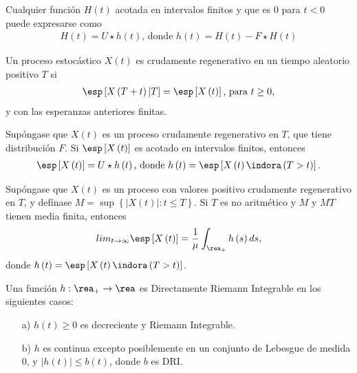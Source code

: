 \begin{Prop}
Cualquier funci\'on $H\left(t\right)$ acotada en intervalos finitos y que es 0 para $t<0$ puede expresarse como
\begin{eqnarray*}
H\left(t\right)=U\star h\left(t\right)\textrm{,  donde }h\left(t\right)=H\left(t\right)-F\star H\left(t\right)
\end{eqnarray*}
\end{Prop}

\begin{Def}
Un proceso estoc\'astico $X\left(t\right)$ es crudamente regenerativo en un tiempo aleatorio positivo $T$ si
\begin{eqnarray*}
\esp\left[X\left(T+t\right)|T\right]=\esp\left[X\left(t\right)\right]\textrm{, para }t\geq0,\end{eqnarray*}
y con las esperanzas anteriores finitas.
\end{Def}

\begin{Prop}
Sup\'ongase que $X\left(t\right)$ es un proceso crudamente regenerativo en $T$, que tiene distribuci\'on $F$. Si $\esp\left[X\left(t\right)\right]$ es acotado en intervalos finitos, entonces
\begin{eqnarray*}
\esp\left[X\left(t\right)\right]=U\star h\left(t\right)\textrm{,  donde }h\left(t\right)=\esp\left[X\left(t\right)\indora\left(T>t\right)\right].
\end{eqnarray*}
\end{Prop}

\begin{Teo}
Sup\'ongase que $X\left(t\right)$ es un proceso con valores positivo crudamente regenerativo en $T$, y def\'inase $M=\sup\left\{|X\left(t\right)|:t\leq T\right\}$. Si $T$ es no aritm\'etico y $M$ y $MT$ tienen media finita, entonces
\begin{eqnarray*}
lim_{t\rightarrow\infty}\esp\left[X\left(t\right)\right]=\frac{1}{\mu}\int_{\rea_{+}}h\left(s\right)ds,
\end{eqnarray*}
donde $h\left(t\right)=\esp\left[X\left(t\right)\indora\left(T>t\right)\right]$.
\end{Teo}


\begin{Note} Una funci\'on $h:\rea_{+}\rightarrow\rea$ es Directamente Riemann Integrable en los siguientes casos:
\begin{itemize}
\item[a)] $h\left(t\right)\geq0$ es decreciente y Riemann Integrable.
\item[b)] $h$ es continua excepto posiblemente en un conjunto de Lebesgue de medida 0, y $|h\left(t\right)|\leq b\left(t\right)$, donde $b$ es DRI.
\end{itemize}
\end{Note}

